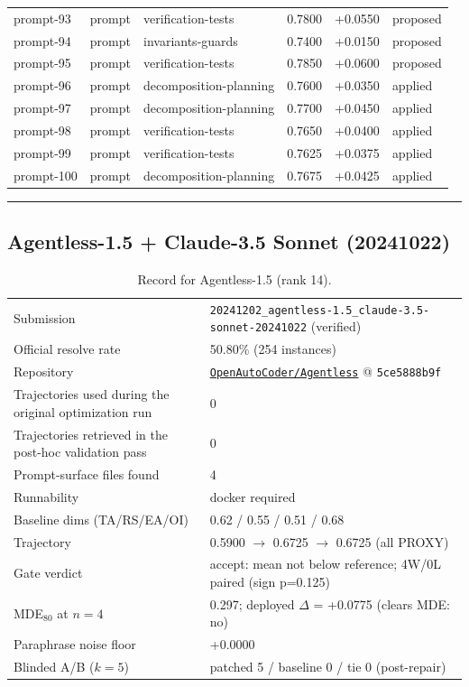 \begin{center}
\begin{longtable}{llp{5.2cm}rrl}
prompt-93 & prompt & verification-tests & 0.7800 & +0.0550 & proposed \\
prompt-94 & prompt & invariants-guards & 0.7400 & +0.0150 & proposed \\
prompt-95 & prompt & verification-tests & 0.7850 & +0.0600 & proposed \\
prompt-96 & prompt & decomposition-planning & 0.7600 & +0.0350 & applied \\
prompt-97 & prompt & decomposition-planning & 0.7700 & +0.0450 & applied \\
prompt-98 & prompt & verification-tests & 0.7650 & +0.0400 & applied \\
prompt-99 & prompt & verification-tests & 0.7625 & +0.0375 & applied \\
prompt-100 & prompt & decomposition-planning & 0.7675 & +0.0425 & applied \\
\bottomrule\end{longtable}\end{center}
\par\bigskip\hrule\bigskip
\subsection{Agentless-1.5 + Claude-3.5 Sonnet (20241022)}
\label{app:agent14}
\begin{table}[H]\centering\scriptsize
\caption{Record for Agentless-1.5 (rank 14).}
\begin{tabular}{lp{8.2cm}}\toprule
Submission & \texttt{20241202\_\allowbreak{}agentless-1.5\_\allowbreak{}claude-3.5-sonnet-20241022} (verified) \\
Official resolve rate & 50.80\% (254 instances) \\
Repository & \href{https://github.com/OpenAutoCoder/Agentless}{\texttt{OpenAutoCoder/Agentless}} @ \texttt{5ce5888b9f} \\
Trajectories used during the original optimization run & 0 \\
Trajectories retrieved in the post-hoc validation pass & 0 \\
Prompt-surface files found & 4 \\
Runnability & docker required \\
Baseline dims (TA/RS/EA/OI) & 0.62 / 0.55 / 0.51 / 0.68 \\
Trajectory & 0.5900 $\to$ 0.6725 $\to$ 0.6725 (all PROXY) \\
Gate verdict & accept: mean not below reference; 4W/0L paired (sign p=0.125) \\
MDE$_{80}$ at $n{=}4$ & 0.297; deployed $\Delta$ = +0.0775 (clears MDE: no) \\
Paraphrase noise floor & +0.0000 \\
Blinded A/B ($k{=}5$) & patched 5 / baseline 0 / tie 0 (post-repair) \\
\bottomrule\end{tabular}\end{table}
